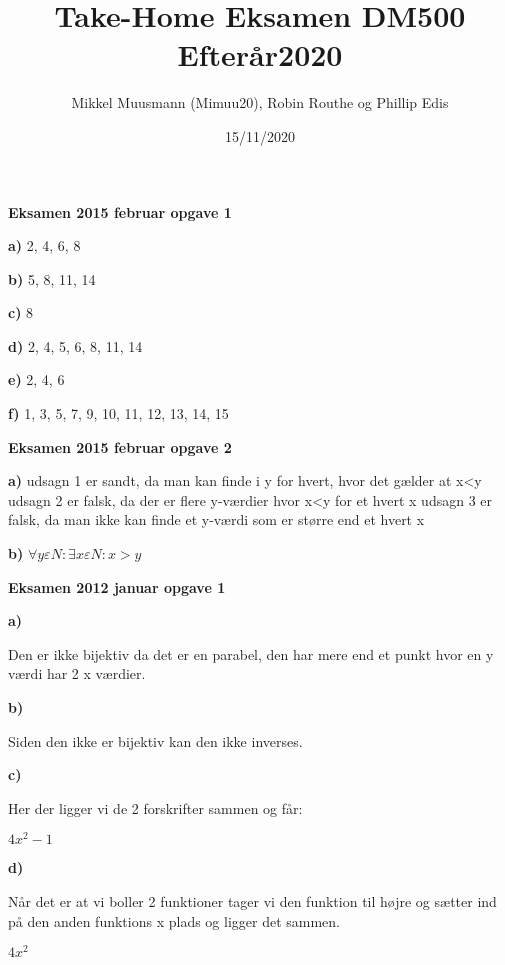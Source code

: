 \documentclass{article}
\title{\textbf{Take-Home Eksamen DM500 Efterår2020}}
\author{Mikkel Muusmann (Mimuu20), Robin Routhe og Phillip Edis}
\date{15/11/2020}
\begin{document}
\maketitle



\textbf{Eksamen 2015 februar opgave 1}

\textbf{a)}
	2, 4, 6, 8

\textbf{b)}
	5, 8, 11, 14

\textbf{c)}
	8

\textbf{d)}
	2, 4, 5, 6, 8, 11, 14

\textbf{e)}
	2, 4, 6

\textbf{f)}
	1, 3, 5, 7, 9, 10, 11, 12, 13, 14, 15
	
\textbf{Eksamen 2015 februar opgave 2}

\textbf{a)}
	udsagn 1 er sandt, da man kan finde i y for hvert, hvor det gælder at x<y
	udsagn 2 er falsk, da der er flere y-værdier hvor x<y for et hvert x
	udsagn 3 er falsk, da man ikke kan finde et y-værdi som er større end et hvert x

\textbf{b)}
	$\forall y \varepsilon N: \exists x \varepsilon N: x > y$



\textbf{Eksamen 2012 januar opgave 1}

\textbf{a)}

Den er ikke bijektiv da det er en parabel, den har mere end et punkt
hvor en y værdi har 2 x værdier. 

\textbf{b)}

Siden den ikke er bijektiv kan den ikke inverses.

\textbf{c)}

Her der ligger vi de 2 forskrifter sammen og får:

$4x^2-1$

\textbf{d)}

Når det er at vi boller 2 funktioner tager vi den funktion til højre og sætter ind på den anden funktions x plads og ligger det sammen.

$4x^2$
\end{document}
